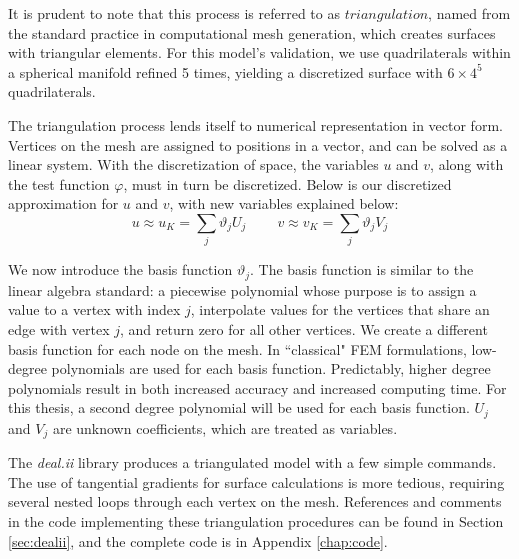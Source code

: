 \documentclass[12pt]{article}
\begin{document}

It is prudent to note that this process is referred to as $triangulation$, named from the standard practice in computational mesh generation, which creates surfaces with triangular elements. For this model's validation, we use quadrilaterals within a spherical manifold refined 5 times, yielding a discretized surface with $6\times 4^5$ quadrilaterals.




The triangulation process lends itself to numerical representation in vector form. Vertices on the mesh are assigned to positions in a vector, and can be solved as a linear system. With the discretization of space, the variables $u$ and $v$, along with the test function $\varphi$, must in turn be discretized. Below is our discretized approximation for $u$ and $v$, with new variables explained below:
\begin{equation}
u \approx u_K = \sum_j\vartheta_j U_j ~~~~~~~~~~ v \approx v_K = \sum_j\vartheta_j V_j
\end{equation}

We now introduce the basis function $\vartheta_j$. The basis function is similar to the linear algebra standard: a piecewise polynomial whose purpose is to assign a value to a vertex with index $j$, interpolate values for the vertices that share an edge with vertex $j$, and return zero for all other vertices. We create a different basis function for each node on the mesh. In ``classical" FEM formulations, low-degree polynomials are used for each basis function. Predictably, higher degree polynomials result in both increased accuracy and increased computing time. For this thesis, a second degree polynomial will be used for each basis function. $U_j$ and $V_j$ are unknown coefficients, which are treated as variables.

The \textit{deal.ii} library produces a triangulated model with a few simple commands. The use of tangential gradients for surface calculations is more tedious, requiring several nested loops through each vertex on the mesh. References and comments in the code implementing these triangulation procedures can be found in Section \ref{sec:dealii}, and the complete code is in  Appendix \ref{chap:code}. 
\end{document}
